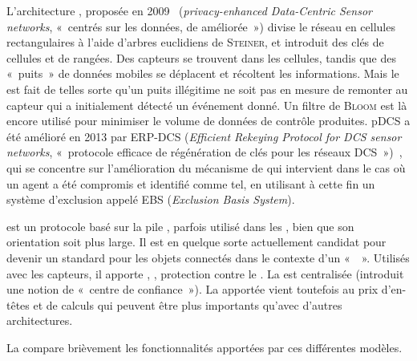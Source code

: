 L'architecture , proposée en 2009~\cite{SZZCY09} (\textit{privacy-enhanced Data-Centric Sensor networks}, « \rcs centrés sur les données, de  améliorée ») divise le réseau en cellules rectangulaires à l'aide d'arbres euclidiens de \textsc{Steiner}, et introduit des clés de cellules et de rangées.
Des capteurs se trouvent dans les cellules, tandis que des « puits » de données mobiles se déplacent et récoltent les informations.
Mais le  est fait de telles sorte qu'un puits illégitime ne soit pas en mesure de remonter au capteur qui a initialement détecté un événement donné.
Un filtre de \textsc{Bloom} est là encore utilisé pour minimiser le volume de données de contrôle produites.
pDCS a été amélioré en 2013 par ERP-DCS (\textit{Efficient Rekeying Protocol for DCS sensor networks}, « protocole efficace de régénération de clés pour les réseaux DCS »)~\cite{HYD13}, qui se concentre sur l'amélioration du mécanisme de  qui intervient dans le cas où un agent a été compromis et identifié comme tel, en utilisant à cette fin un système d'exclusion appelé EBS (\textit{Exclusion Basis System}).

\zigbee\cite{zigbee} est un protocole basé sur la pile \ieeeff, parfois utilisé dans les \rcs, bien que son orientation soit plus large.
Il est en quelque sorte actuellement candidat pour devenir un standard pour les objets connectés dans le contexte d'un «  ».
Utilisés avec les capteurs, il apporte , , protection contre le .
La  est centralisée (\zigbee introduit une notion de « centre de confiance »).
La \secu apportée vient toutefois au prix d'en-têtes et de calculs qui peuvent être plus importants qu'avec d'autres architectures.

La  compare brièvement les fonctionnalités apportées par ces différentes modèles.

